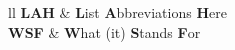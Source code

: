 \documentclass[
11pt, %
ngerman, %
singlespacing, %
liststotoc, %
headsepline, %
]{MastersDoctoralThesis} %
\begin{document}
\tableofcontents %

\listoffigures %

\listoftables %

\lstlistoflistings %


\begin{abbreviations}{ll} %
\textbf{LAH} & \textbf{L}ist \textbf{A}bbreviations \textbf{H}ere\\
\textbf{WSF} & \textbf{W}hat (it) \textbf{S}tands \textbf{F}or\\

\end{abbreviations}




\end{document}
